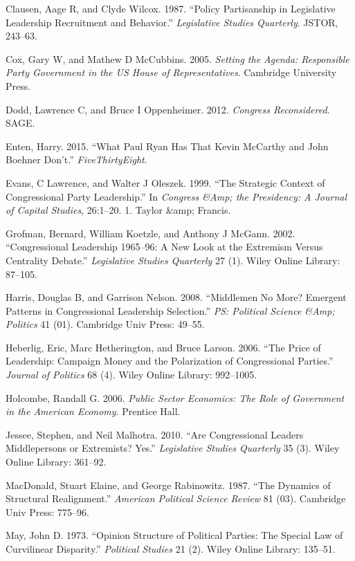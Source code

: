 \documentclass[12pt,twoside]{reedthesis}
\begin{document}
  Clausen, Aage R, and Clyde Wilcox. 1987. ``Policy Partisanship in
  Legislative Leadership Recruitment and Behavior.'' \emph{Legislative
  Studies Quarterly}. JSTOR, 243--63.
  
  Cox, Gary W, and Mathew D McCubbins. 2005. \emph{Setting the Agenda:
  Responsible Party Government in the US House of Representatives}.
  Cambridge University Press.
  
  Dodd, Lawrence C, and Bruce I Oppenheimer. 2012. \emph{Congress
  Reconsidered}. SAGE.
  
  Enten, Harry. 2015. ``What Paul Ryan Has That Kevin McCarthy and John
  Boehner Don't.'' \emph{FiveThirtyEight}.
  
  Evans, C Lawrence, and Walter J Oleszek. 1999. ``The Strategic Context
  of Congressional Party Leadership.'' In \emph{Congress \&Amp; the
  Presidency: A Journal of Capital Studies}, 26:1--20. 1. Taylor \&amp;
  Francis.
  
  Grofman, Bernard, William Koetzle, and Anthony J McGann. 2002.
  ``Congressional Leadership 1965--96: A New Look at the Extremism Versus
  Centrality Debate.'' \emph{Legislative Studies Quarterly} 27 (1). Wiley
  Online Library: 87--105.
  
  Harris, Douglas B, and Garrison Nelson. 2008. ``Middlemen No More?
  Emergent Patterns in Congressional Leadership Selection.'' \emph{PS:
  Political Science \&Amp; Politics} 41 (01). Cambridge Univ Press:
  49--55.
  
  Heberlig, Eric, Marc Hetherington, and Bruce Larson. 2006. ``The Price
  of Leadership: Campaign Money and the Polarization of Congressional
  Parties.'' \emph{Journal of Politics} 68 (4). Wiley Online Library:
  992--1005.
  
  Holcombe, Randall G. 2006. \emph{Public Sector Economics: The Role of
  Government in the American Economy}. Prentice Hall.
  
  Jessee, Stephen, and Neil Malhotra. 2010. ``Are Congressional Leaders
  Middlepersons or Extremists? Yes.'' \emph{Legislative Studies Quarterly}
  35 (3). Wiley Online Library: 361--92.
  
  MacDonald, Stuart Elaine, and George Rabinowitz. 1987. ``The Dynamics of
  Structural Realignment.'' \emph{American Political Science Review} 81
  (03). Cambridge Univ Press: 775--96.
  
  May, John D. 1973. ``Opinion Structure of Political Parties: The Special
  Law of Curvilinear Disparity.'' \emph{Political Studies} 21 (2). Wiley
  Online Library: 135--51.
  
\end{document}
